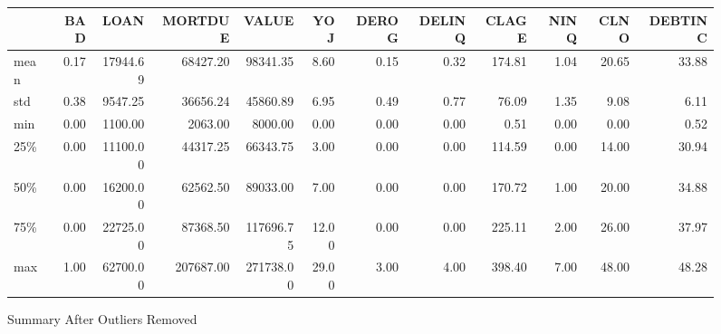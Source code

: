 \begin{landscape}
\begin{figure}[ht]
	\centering
	\renewcommand{\arraystretch}{2}
	\begin{tabular}{lrrrrrrrrrrr}
	\toprule
	{} &      BAD &      LOAN &    MORTDUE &      VALUE &      YOJ &    DEROG &   DELINQ &    CLAGE &     NINQ &     CLNO &  DEBTINC \\
	\midrule
	mean  &     0.17 &  17944.69 &   68427.20 &   98341.35 &     8.60 &     0.15 &     0.32 &   174.81 &     1.04 &    20.65 &    33.88 \\
	std   &     0.38 &   9547.25 &   36656.24 &   45860.89 &     6.95 &     0.49 &     0.77 &    76.09 &     1.35 &     9.08 &     6.11 \\
	min   &     0.00 &   1100.00 &    2063.00 &    8000.00 &     0.00 &     0.00 &     0.00 &     0.51 &     0.00 &     0.00 &     0.52 \\
	25\%   &     0.00 &  11100.00 &   44317.25 &   66343.75 &     3.00 &     0.00 &     0.00 &   114.59 &     0.00 &    14.00 &    30.94 \\
	50\%   &     0.00 &  16200.00 &   62562.50 &   89033.00 &     7.00 &     0.00 &     0.00 &   170.72 &     1.00 &    20.00 &    34.88 \\
	75\%   &     0.00 &  22725.00 &   87368.50 &  117696.75 &    12.00 &     0.00 &     0.00 &   225.11 &     2.00 &    26.00 &    37.97 \\
	max   &     1.00 &  62700.00 &  207687.00 &  271738.00 &    29.00 &     3.00 &     4.00 &   398.40 &     7.00 &    48.00 &    48.28 \\
	\bottomrule
	\end{tabular}
	\caption{Summary After Outliers Removed \label{SUM_AFT_TBL}}
\end{figure}
\end{landscape}

